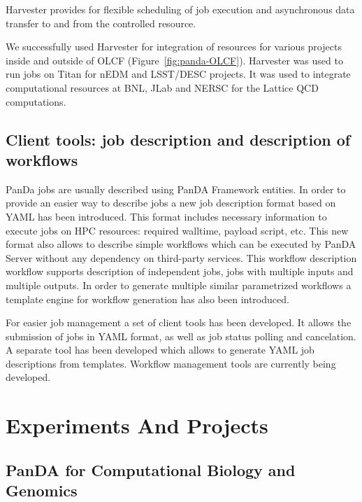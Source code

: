 \documentclass{webofc}
\begin{document}
Harvester provides for flexible scheduling of job execution and asynchronous data transfer to and from the controlled resource.

We successfully used Harvester for integration of resources for various projects inside and outside of OLCF (Figure~\ref{fig:panda-OLCF}). Harvester was used to run jobs on Titan for nEDM and LSST/DESC projects. It was used to integrate computational resources at BNL, JLab and NERSC for the Lattice QCD computations.

\subsection{Client tools: job description and description of workflows}

PanDa jobs are usually described using PanDA Framework entities. In order to provide an easier way to describe jobs a new job description format based on YAML has been introduced. This format includes necessary information to execute jobs on HPC resources: required walltime, payload script, etc. This new format also allows to describe simple workflows which can be executed by PanDA Server without any dependency on third-party services. This workflow description workflow supports description of independent jobs, jobs with multiple inputs and multiple outputs. In order to generate multiple similar parametrized workflows a template engine for workflow generation has also been introduced.

For easier job management a set of client tools has been developed. It allows the submission of jobs in YAML format, as well as job status polling and cancelation. A separate tool has been developed which allows to generate YAML job descriptions from templates. Workflow management tools are currently being developed.



\section{Experiments And Projects}
\subsection{PanDA for Computational Biology and Genomics} \label{section_biology}
\end{document}
